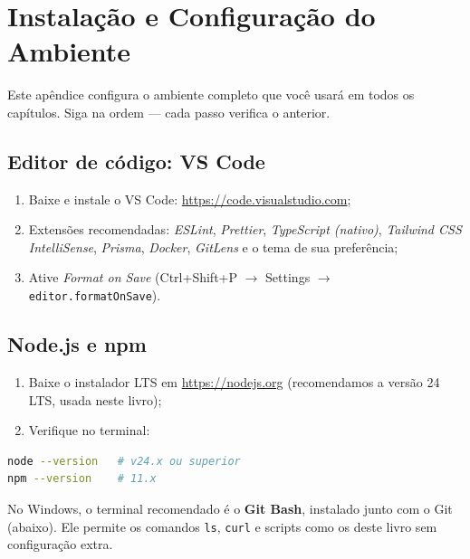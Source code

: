 \chapter{Instalação e Configuração do Ambiente}
\label{apendice:instalacao}

Este apêndice configura o ambiente completo que você usará em todos os
capítulos. Siga na ordem — cada passo verifica o anterior.

\section{Editor de código: VS Code}

\begin{enumerate}[leftmargin=*, itemsep=0.3em]
  \item Baixe e instale o VS Code: \url{https://code.visualstudio.com};
  \item Extensões recomendadas: \emph{ESLint}, \emph{Prettier},
  \emph{TypeScript (nativo)}, \emph{Tailwind CSS IntelliSense},
  \emph{Prisma}, \emph{Docker}, \emph{GitLens} e o tema de sua preferência;
  \item Ative \emph{Format on Save} (Ctrl+Shift+P $\rightarrow$ Settings
  $\rightarrow$ \texttt{editor.formatOnSave}).
\end{enumerate}

\section{Node.js e npm}

\begin{enumerate}[leftmargin=*, itemsep=0.3em]
  \item Baixe o instalador LTS em \url{https://nodejs.org} (recomendamos a
  versão 24 LTS, usada neste livro);
  \item Verifique no terminal:
\end{enumerate}

\begin{lstlisting}[style=livro, language=Bash, caption={Verificação do Node.}, label={list:inst-node}]
node --version   # v24.x ou superior
npm --version    # 11.x
\end{lstlisting}

\begin{caixadica}
No Windows, o terminal recomendado é o \textbf{Git Bash}, instalado junto com
o Git (abaixo). Ele permite os comandos \texttt{ls}, \texttt{curl} e scripts
como os deste livro sem configuração extra.
\end{caixadica}

